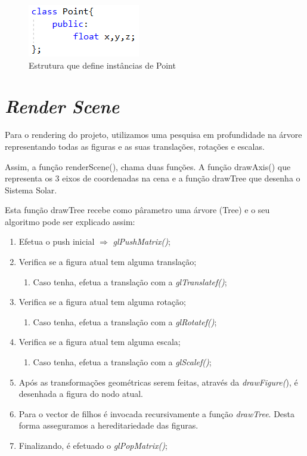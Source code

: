\documentclass[a4paper]{article}
\begin{document}
\begin{figure}[H]
\centering
\includegraphics[scale=0.8]{point.png}
\caption{Estrutura que define instâncias de Point}
\label{img:Point}
\end{figure}


\newpage

\section{\textit{Render Scene}}
Para o rendering do projeto, utilizamos uma pesquisa em profundidade na árvore representando  todas as figuras e as suas translações, rotações e escalas.

Assim, a função renderScene(), chama duas funções. A função drawAxis() que representa os 3 eixos de coordenadas na cena e a função drawTree que desenha o Sistema Solar.

Esta função drawTree recebe como pârametro uma árvore (Tree) e o seu algoritmo pode ser explicado assim:


\ttfamily
\begin{enumerate}
 \item Efetua o push inicial  $\Rightarrow$ \textit{glPushMatrix()};
 \item Verifica se a figura atual tem alguma translação;
    \begin{enumerate}
      \item Caso tenha, efetua a translação com a \textit{glTranslatef()};
    \end{enumerate}
  \item Verifica se a figura atual tem alguma rotação;
    \begin{enumerate}
      \item Caso tenha, efetua a translação com a \textit{glRotatef()};
    \end{enumerate}
 \item Verifica se a figura atual tem alguma escala;
    \begin{enumerate}
      \item Caso tenha, efetua a translação com a \textit{glScalef()};
    \end{enumerate}
 \item Após as transformações geométricas serem feitas, através da \textit{drawFigure(}), é desenhada a figura do nodo atual.
 \item Para o vector de filhos é invocada recursivamente a função \emph{drawTree}. Desta forma asseguramos a hereditariedade das figuras.
 \item Finalizando, é efetuado o \textit{glPopMatrix()};
\end{enumerate}
\end{document}
